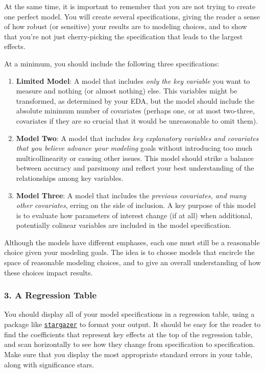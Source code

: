 \documentclass[
]{article}
\providecommand{\tightlist}{%
  \setlength{\itemsep}{0pt}\setlength{\parskip}{0pt}}
\begin{document}
At the same time, it is important to remember that you are not trying to
create one perfect model. You will create several specifications, giving
the reader a sense of how robust (or sensitive) your results are to
modeling choices, and to show that you're not just cherry-picking the
specification that leads to the largest effects.

At a minimum, you should include the following three specifications:

\begin{enumerate}
\def\labelenumi{\arabic{enumi}.}
\tightlist
\item
  \textbf{Limited Model}: A model that includes \emph{only the key
  variable} you want to measure and nothing (or almost nothing) else.
  This variables might be transformed, as determined by your EDA, but
  the model should include the absolute minimum number of covariates
  (perhaps one, or at most two-three, covariates if they are so crucial
  that it would be unreasonable to omit them).
\item
  \textbf{Model Two}: A model that includes \emph{key explanatory
  variables and covariates that you believe advance your modeling} goals
  without introducing too much multicollinearity or causing other
  issues. This model should strike a balance between accuracy and
  parsimony and reflect your best understanding of the relationships
  among key variables.
\item
  \textbf{Model Three}: A model that includes the \emph{previous
  covariates, and many other covariates}, erring on the side of
  inclusion. A key purpose of this model is to evaluate how parameters
  of interest change (if at all) when additional, potentially colinear
  variables are included in the model specification.
\end{enumerate}

Although the models have different emphases, each one must still be a
reasonable choice given your modeling goals. The idea is to choose
models that encircle the space of reasonable modeling choices, and to
give an overall understanding of how these choices impact results.

\hypertarget{a-regression-table}{%
\subsubsection{3. A Regression Table}\label{a-regression-table}}

You should display all of your model specifications in a regression
table, using a package like
\href{https://cran.r-project.org/web/packages/stargazer/vignettes/stargazer.pdf}{\texttt{stargazer}}
to format your output. It should be easy for the reader to find the
coefficients that represent key effects at the top of the regression
table, and scan horizontally to see how they change from specification
to specification. Make sure that you display the most appropriate
standard errors in your table, along with significance stars.
\end{document}
